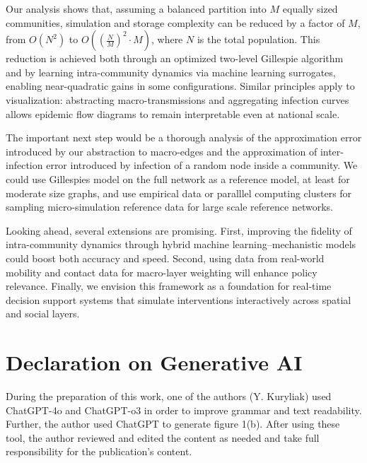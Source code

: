 \documentclass[
]{ceurart}
\begin{document}
Our analysis shows that, assuming a balanced partition into \(M\) equally sized communities, simulation and storage complexity can be reduced by a factor of \(M\), from \(O(N^2)\) to \(O((\frac{N}{M})^2 \cdot M)\), where \(N\) is the total population. This reduction is achieved both through an optimized two-level Gillespie algorithm and by learning intra-community dynamics via machine learning surrogates, enabling near-quadratic gains in some configurations. Similar principles apply to visualization: abstracting macro-transmissions and aggregating infection curves allows epidemic flow diagrams to remain interpretable even at national scale.

The important next step would be a thorough analysis of the approximation error introduced by our abstraction to macro-edges and the approximation of inter-infection error introduced by infection of a random node inside a community. We could use Gillespies model on the full network as a reference model, at least for moderate size graphs, and use empirical data or paralllel computing clusters for sampling micro-simulation reference data for large scale reference networks.

Looking ahead, several extensions are promising. First, improving the fidelity of intra-community dynamics through hybrid machine learning–mechanistic models could boost both accuracy and speed. Second, using data from real-world mobility and contact data for macro-layer weighting will enhance policy relevance. Finally, we envision this framework as a foundation for real-time decision support systems that simulate interventions interactively across spatial and social layers.


\section*{Declaration on Generative AI}
During the preparation of this work, one of the authors (Y. Kuryliak) used ChatGPT-4o and ChatGPT-o3 in order to improve grammar and text readability. Further, the author used ChatGPT to generate figure 1(b). After using these tool, the author reviewed and edited the content as needed and take full responsibility for the publication’s content. 



\end{document}
